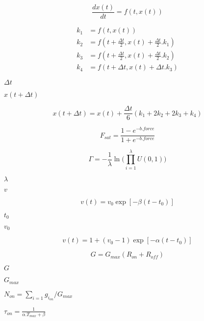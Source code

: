 \documentclass{article}
\begin{document}
\begin{equation} \frac{dx(t)}{dt} = f(t, x(t)) \end{equation}
\pagebreak

\begin{align} k_1 &= f(t,x(t))\\ k_2 &= f(t+\frac{\Delta t}{2}, x(t) + \frac{\Delta t}{2}.k_1)\\ k_3 &= f(t+\frac{\Delta t}{2}, x(t) + \frac{\Delta t}{2}.k_2)\\ k_4 &= f(t+\Delta t, x(t) + \Delta t.k_3) \end{align}
\pagebreak

$\Delta t$
\pagebreak

$x(t+\Delta t)$
\pagebreak

\begin{equation} x(t+\Delta t) = x(t) + \frac{\Delta t}{6}(k_1 + 2k_2 + 2k_3+k_4) \end{equation}
\pagebreak

\begin{equation} F_{sat} = \frac{1-e^{-b.force}}{1+e^{-b.force}} \end{equation}
\pagebreak

\begin{equation} \Gamma = -\frac{1}{\lambda}\ln(\limits\prod_{i=1}^{\lambda} U(0,1)) \end{equation}
\pagebreak

$\lambda$
\pagebreak

$v$
\pagebreak

\begin{equation} v(t) = v_0\exp[-\beta(t-t_0)] \end{equation}
\pagebreak

$t_0$
\pagebreak

$v_0$
\pagebreak

\begin{equation} v(t) = 1 + (v_0 - 1)\exp[-\alpha(t-t_0)] \end{equation}
\pagebreak

\begin{equation} G = G_{max}(R_{on} + R_{off}) \end{equation}
\pagebreak

$G$
\pagebreak

$G_{max}$
\pagebreak

$N_{on}=\limits\sum_{i=1}g_{i_{on}}/G_{max}$
\pagebreak

$\tau_{on}=\frac{1}{\alpha.T_{max} +\beta}$
\pagebreak
\end{document}
